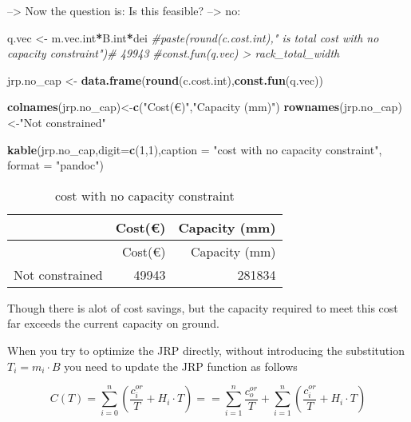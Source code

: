 \documentclass[
]{article}
\newenvironment{Shaded}{\begin{snugshade}}{\end{snugshade}}
\newcommand{\CommentTok}[1]{\textcolor[rgb]{0.56,0.35,0.01}{\textit{#1}}}
\newcommand{\DataTypeTok}[1]{\textcolor[rgb]{0.13,0.29,0.53}{#1}}
\newcommand{\DecValTok}[1]{\textcolor[rgb]{0.00,0.00,0.81}{#1}}
\newcommand{\KeywordTok}[1]{\textcolor[rgb]{0.13,0.29,0.53}{\textbf{#1}}}
\newcommand{\NormalTok}[1]{#1}
\newcommand{\OperatorTok}[1]{\textcolor[rgb]{0.81,0.36,0.00}{\textbf{#1}}}
\newcommand{\StringTok}[1]{\textcolor[rgb]{0.31,0.60,0.02}{#1}}
\begin{document}
--\textgreater{} Now the question is: Is this feasible? --\textgreater{}
no:

\begin{Shaded}
\begin{Highlighting}[]
\NormalTok{q.vec <-}\StringTok{ }\NormalTok{m.vec.int}\OperatorTok{*}\NormalTok{B.int}\OperatorTok{*}\NormalTok{dei}
\CommentTok{#paste(round(c.cost.int)," is total cost with no capacity constraint")# 49943}
\CommentTok{#const.fun(q.vec) > rack_total_width}

\NormalTok{jrp.no_cap <-}\StringTok{ }\KeywordTok{data.frame}\NormalTok{(}\KeywordTok{round}\NormalTok{(c.cost.int),}\KeywordTok{const.fun}\NormalTok{(q.vec))}

\KeywordTok{colnames}\NormalTok{(jrp.no_cap)<-}\KeywordTok{c}\NormalTok{(}\StringTok{"Cost(€)"}\NormalTok{,}\StringTok{"Capacity (mm)"}\NormalTok{)}
\KeywordTok{rownames}\NormalTok{(jrp.no_cap)<-}\StringTok{"Not constrained"}

\KeywordTok{kable}\NormalTok{(jrp.no_cap,}\DataTypeTok{digit=}\KeywordTok{c}\NormalTok{(}\DecValTok{1}\NormalTok{,}\DecValTok{1}\NormalTok{),}\DataTypeTok{caption =} \StringTok{"cost with no capacity constraint"}\NormalTok{, }\DataTypeTok{format =} \StringTok{"pandoc"}\NormalTok{)}
\end{Highlighting}
\end{Shaded}

\begin{longtable}[]{@{}lrr@{}}
\caption{cost with no capacity constraint}\tabularnewline
\toprule
& Cost(€) & Capacity (mm)\tabularnewline
\midrule
\endfirsthead
\toprule
& Cost(€) & Capacity (mm)\tabularnewline
\midrule
\endhead
Not constrained & 49943 & 281834\tabularnewline
\bottomrule
\end{longtable}

Though there is alot of cost savings, but the capacity required to meet
this cost far exceeds the current capacity on ground.

When you try to optimize the JRP directly, without introducing the
substitution \(T_i = m_i \cdot B\) you need to update the JRP function
as follows

\[C(T)=\sum_{i=0}^n (\frac {c_i^{or}}{T}+H_i \cdot T) == \sum_{i=1}^n \frac {c_o^{or}}{T}+ \sum_{i=1}^n (\frac {c_i^{or}}{T}+H_i \cdot T) \]
\end{document}

